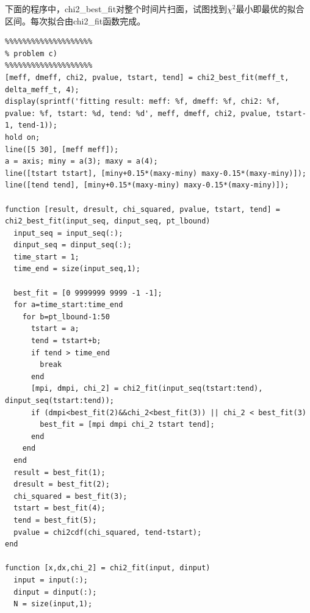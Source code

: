 \documentclass[paper=a4, fontsize=11pt]{scrartcl} %
\numberwithin{equation}{section} %
\numberwithin{figure}{section} %
\numberwithin{table}{section} %
\begin{document}
\begin{CJK*}{UTF8}{gbsn}
下面的程序中，chi2\_best\_fit对整个时间片扫面，试图找到$\chi^2$最小即最优的拟合区间。每次拟合由chi2\_fit函数完成。
\lstset{language=MATLAB}
\begin{lstlisting}
%%%%%%%%%%%%%%%%%%%%
% problem c)
%%%%%%%%%%%%%%%%%%%%
[meff, dmeff, chi2, pvalue, tstart, tend] = chi2_best_fit(meff_t, delta_meff_t, 4);
display(sprintf('fitting result: meff: %f, dmeff: %f, chi2: %f, pvalue: %f, tstart: %d, tend: %d', meff, dmeff, chi2, pvalue, tstart-1, tend-1));
hold on;
line([5 30], [meff meff]);
a = axis; miny = a(3); maxy = a(4);
line([tstart tstart], [miny+0.15*(maxy-miny) maxy-0.15*(maxy-miny)]);
line([tend tend], [miny+0.15*(maxy-miny) maxy-0.15*(maxy-miny)]);

function [result, dresult, chi_squared, pvalue, tstart, tend] = chi2_best_fit(input_seq, dinput_seq, pt_lbound)
  input_seq = input_seq(:);
  dinput_seq = dinput_seq(:);
  time_start = 1;
  time_end = size(input_seq,1);
  
  best_fit = [0 9999999 9999 -1 -1];
  for a=time_start:time_end
    for b=pt_lbound-1:50
      tstart = a;
      tend = tstart+b;
      if tend > time_end
        break
      end
      [mpi, dmpi, chi_2] = chi2_fit(input_seq(tstart:tend), dinput_seq(tstart:tend));
      if (dmpi<best_fit(2)&&chi_2<best_fit(3)) || chi_2 < best_fit(3)
        best_fit = [mpi dmpi chi_2 tstart tend];
      end
    end
  end
  result = best_fit(1);
  dresult = best_fit(2);
  chi_squared = best_fit(3);
  tstart = best_fit(4);
  tend = best_fit(5);
  pvalue = chi2cdf(chi_squared, tend-tstart);
end

function [x,dx,chi_2] = chi2_fit(input, dinput)
  input = input(:);
  dinput = dinput(:);
  N = size(input,1);


\end{lstlisting}
\end{CJK*}
\end{document}

